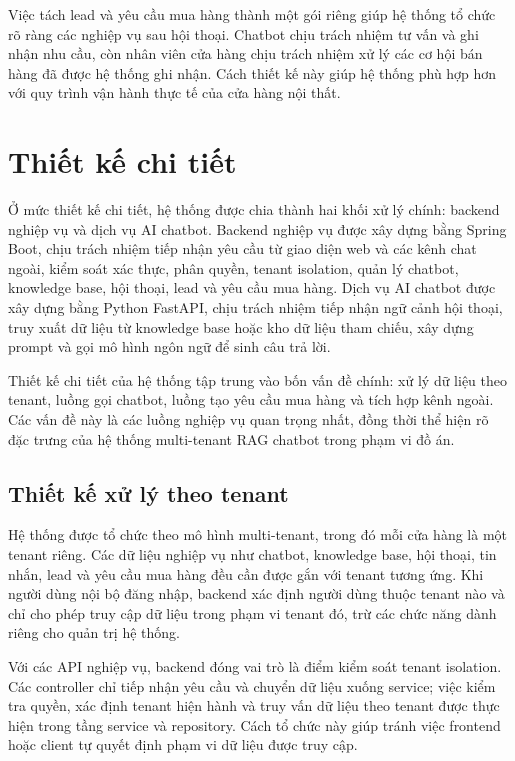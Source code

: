 \documentclass[../DoAn.tex]{subfiles}
\begin{document}
Việc tách lead và yêu cầu mua hàng thành một gói riêng giúp hệ thống tổ chức rõ ràng các nghiệp vụ sau hội thoại. Chatbot chịu trách nhiệm tư vấn và ghi nhận nhu cầu, còn nhân viên cửa hàng chịu trách nhiệm xử lý các cơ hội bán hàng đã được hệ thống ghi nhận. Cách thiết kế này giúp hệ thống phù hợp hơn với quy trình vận hành thực tế của cửa hàng nội thất.

\section{Thiết kế chi tiết}

Ở mức thiết kế chi tiết, hệ thống được chia thành hai khối xử lý chính: backend nghiệp vụ và dịch vụ AI chatbot. Backend nghiệp vụ được xây dựng bằng Spring Boot, chịu trách nhiệm tiếp nhận yêu cầu từ giao diện web và các kênh chat ngoài, kiểm soát xác thực, phân quyền, tenant isolation, quản lý chatbot, knowledge base, hội thoại, lead và yêu cầu mua hàng. Dịch vụ AI chatbot được xây dựng bằng Python FastAPI, chịu trách nhiệm tiếp nhận ngữ cảnh hội thoại, truy xuất dữ liệu từ knowledge base hoặc kho dữ liệu tham chiếu, xây dựng prompt và gọi mô hình ngôn ngữ để sinh câu trả lời.

Thiết kế chi tiết của hệ thống tập trung vào bốn vấn đề chính: xử lý dữ liệu theo tenant, luồng gọi chatbot, luồng tạo yêu cầu mua hàng và tích hợp kênh ngoài. Các vấn đề này là các luồng nghiệp vụ quan trọng nhất, đồng thời thể hiện rõ đặc trưng của hệ thống multi-tenant RAG chatbot trong phạm vi đồ án.

\subsection{Thiết kế xử lý theo tenant}

Hệ thống được tổ chức theo mô hình multi-tenant, trong đó mỗi cửa hàng là một tenant riêng. Các dữ liệu nghiệp vụ như chatbot, knowledge base, hội thoại, tin nhắn, lead và yêu cầu mua hàng đều cần được gắn với tenant tương ứng. Khi người dùng nội bộ đăng nhập, backend xác định người dùng thuộc tenant nào và chỉ cho phép truy cập dữ liệu trong phạm vi tenant đó, trừ các chức năng dành riêng cho quản trị hệ thống.

Với các API nghiệp vụ, backend đóng vai trò là điểm kiểm soát tenant isolation. Các controller chỉ tiếp nhận yêu cầu và chuyển dữ liệu xuống service; việc kiểm tra quyền, xác định tenant hiện hành và truy vấn dữ liệu theo tenant được thực hiện trong tầng service và repository. Cách tổ chức này giúp tránh việc frontend hoặc client tự quyết định phạm vi dữ liệu được truy cập.
\end{document}

